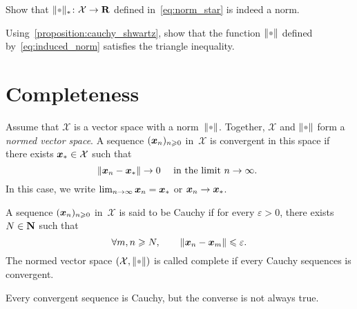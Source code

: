 \begin{exercise}
    Show that $\norm{\placeholder}_*\colon \mathcal X \to \real$ defined in~\eqref{eq:norm_star} is indeed a norm.
\end{exercise}

\begin{exercise}
    \label{exercise:triangle_inequality}
    Using~\cref{proposition:cauchy_shwartz},
    show that the function $\norm{\placeholder}$ defined by~\eqref{eq:induced_norm} satisfies the triangle inequality.
\end{exercise}

\section{Completeness}
Assume that $\mathcal X$ is a vector space with a norm~$\norm{\placeholder}$.
Together, $\mathcal X$ and $\norm{\placeholder}$ form a \emph{normed vector space}.
A sequence $(\mathbf{\boldsymbol{x}}_n)_{n \geqslant 0}$ in~$\mathcal X$ is convergent in this space
if there exists $\mathbf{\boldsymbol{x}}_* \in \mathcal X$ such that
\[
    \lVert\mathbf{\boldsymbol{x}}_n - \mathbf{\boldsymbol{x}}_*\rVert \to 0 \quad \text{ in the limit $n \to \infty$. }
\]
In this case,
we write $\lim_{n \to \infty} \mathbf{\boldsymbol{x}}_n = \mathbf{\boldsymbol{x}}_*$ or $\mathbf{\boldsymbol{x}}_n \to \mathbf{\boldsymbol{x}}_*$.
\begin{definition}
    A sequence $(\mathbf{\boldsymbol{x}}_n)_{n \geqslant 0}$ in~$\mathcal X$ is said to be Cauchy if for every $\varepsilon > 0$,
    there exists $N \in \mathbf N$ such that
    \[
        \forall m,n \geqslant N, \qquad
        \lVert\mathbf{\boldsymbol{x}}_n - \mathbf{\boldsymbol{x}}_m\rVert \leqslant \varepsilon.
    \]
    The normed vector space $(\mathcal X, \norm{\placeholder})$ is called complete if every Cauchy sequences is convergent.
\end{definition}
Every convergent sequence is Cauchy,
but the converse is not always true.

